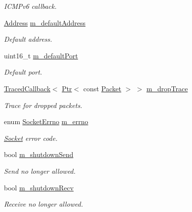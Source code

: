 \begin{DoxyCompactItemize}
\begin{DoxyCompactList}\small\item\em I\+C\+M\+Pv6 callback. \end{DoxyCompactList}\item 
\hyperlink{classns3_1_1Address}{Address} \hyperlink{classns3_1_1UdpSocketImpl_a820bb30415d2627cea60338649d19ccb}{m\+\_\+default\+Address}
\begin{DoxyCompactList}\small\item\em Default address. \end{DoxyCompactList}\item 
uint16\+\_\+t \hyperlink{classns3_1_1UdpSocketImpl_a990120b2cc768c47a6a2a2a1e53875c8}{m\+\_\+default\+Port}
\begin{DoxyCompactList}\small\item\em Default port. \end{DoxyCompactList}\item 
\hyperlink{classns3_1_1TracedCallback}{Traced\+Callback}$<$ \hyperlink{classns3_1_1Ptr}{Ptr}$<$ const \hyperlink{classns3_1_1Packet}{Packet} $>$ $>$ \hyperlink{classns3_1_1UdpSocketImpl_a786fed61e3c4c68280656c4036514c11}{m\+\_\+drop\+Trace}
\begin{DoxyCompactList}\small\item\em Trace for dropped packets. \end{DoxyCompactList}\item 
enum \hyperlink{classns3_1_1Socket_ada1328c5ae0c28cb2a982caf8f6d6cca}{Socket\+Errno} \hyperlink{classns3_1_1UdpSocketImpl_ac35998e8aa2cc588e21752944b0a0095}{m\+\_\+errno}
\begin{DoxyCompactList}\small\item\em \hyperlink{classns3_1_1Socket}{Socket} error code. \end{DoxyCompactList}\item 
bool \hyperlink{classns3_1_1UdpSocketImpl_a9ff4985bbd8bdc29bbe36ba0937149fa}{m\+\_\+shutdown\+Send}
\begin{DoxyCompactList}\small\item\em Send no longer allowed. \end{DoxyCompactList}\item 
bool \hyperlink{classns3_1_1UdpSocketImpl_abda20957e451801973534c38d9d74f4a}{m\+\_\+shutdown\+Recv}
\begin{DoxyCompactList}\small\item\em Receive no longer allowed. \end{DoxyCompactList}\item 

\end{DoxyCompactItemize}
